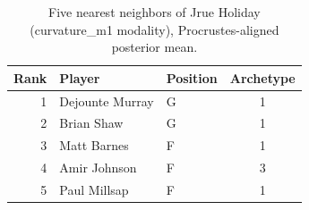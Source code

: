 \begin{table}[htbp]
  \centering\small
  \begin{tabular}{rllc}
    \toprule
    Rank & Player & Position & Archetype \\
    \midrule
    1 & Dejounte Murray & G & 1 \\
    2 & Brian Shaw & G & 1 \\
    3 & Matt Barnes & F & 1 \\
    4 & Amir Johnson & F & 3 \\
    5 & Paul Millsap & F & 1 \\
    \bottomrule
  \end{tabular}
  \caption{Five nearest neighbors of Jrue Holiday (curvature_m1 modality), Procrustes-aligned posterior mean.}
  \label{tab:Jrue_Holiday_neighbors_curvature_m1}
\end{table}

